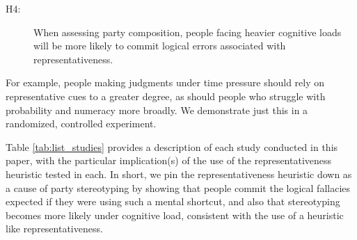 \documentclass[12pt, letterpaper]{article}
\begin{document}
\begin{description}
\item[H4:] When assessing party composition, people facing heavier cognitive loads will be more likely to commit logical errors associated with representativeness.
\end{description} 

\noindent For example, people making judgments under time pressure should rely on representative cues to a greater degree, as should people who struggle with probability and numeracy more broadly. We demonstrate just this in a randomized, controlled experiment.

Table \ref{tab:list_studies} provides a description of each study conducted in this paper, with the particular implication(s) of the use of the representativeness heuristic tested in each. In short, we pin the representativeness heuristic down as a cause of party stereotyping by showing that people commit the logical fallacies expected if they were using such a mental shortcut, and also that stereotyping becomes more likely under cognitive load, consistent with the use of a heuristic like representativeness.
\end{document}
